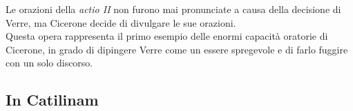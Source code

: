 \documentclass[10pt,a4paper]{article}
\begin{document}
Le orazioni della \textit{actio II} non furono mai pronunciate a causa della decisione di Verre, ma Cicerone decide di divulgare le sue orazioni. \\

Questa opera rappresenta il primo esempio delle enormi capacità oratorie di Cicerone, in grado di dipingere Verre come un essere spregevole e di farlo fuggire con un solo discorso. 

\subsection*{In Catilinam}
\end{document}
